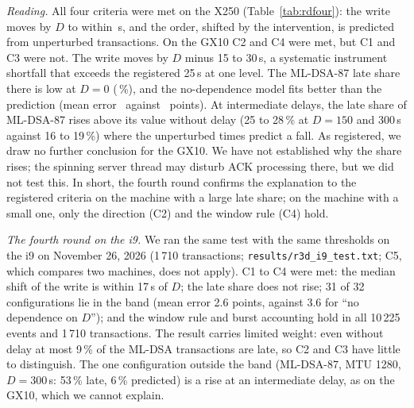 \documentclass[9pt]{article}
\begin{document}
\emph{Reading.} All four criteria were met on the X250 (Table~\ref{tab:rdfour}): the write moves by $D$ to within \RdXDevWorst\,\textmu s, and the order, shifted by the intervention, is predicted from unperturbed transactions. On the GX10 C2 and C4 were met, but C1 and C3 were not. The write moves by $D$ minus 15 to 30\,\textmu s, a systematic instrument shortfall that exceeds the registered 25\,\textmu s at one level. The ML-DSA-87 late share there is low at $D=0$ (\RdALateZero\,\%), and the no-dependence model fits better than the prediction (mean error \RdANullErr\ against \RdAMeanErr\ points). At intermediate delays, the late share of ML-DSA-87 rises above its value without delay (25 to 28\,\% at $D=150$ and 300\,\textmu s against 16 to 19\,\%) where the unperturbed times predict a fall. As registered, we draw no further conclusion for the GX10. We have not established why the share rises; the spinning server thread may disturb ACK processing there, but we did not test this. In short, the fourth round confirms the explanation to the registered criteria on the machine with a large late share; on the machine with a small one, only the direction (C2) and the window rule (C4) hold.

\emph{The fourth round on the i9.} We ran the same test with the same thresholds on the i9 on November 26, 2026 (1\,710 transactions; \texttt{results/r3d\_i9\_test.txt}; C5, which compares two machines, does not apply). C1 to C4 were met: the median shift of the write is within 17\,\textmu s of $D$; the late share does not rise; 31 of 32 configurations lie in the band (mean error 2.6 points, against 3.6 for ``no dependence on $D$''); and the window rule and burst accounting hold in all 10\,225 events and 1\,710 transactions. The result carries limited weight: even without delay at most 9\,\% of the ML-DSA transactions are late, so C2 and C3 have little to distinguish. The one configuration outside the band (ML-DSA-87, MTU 1280, $D=300$\,\textmu s: 53\,\% late, 6\,\% predicted) is a rise at an intermediate delay, as on the GX10, which we cannot explain.
\end{document}
